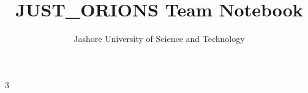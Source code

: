 \documentclass[10pt, a4paper, oneside]{article}
\title{\textbf{JUST\_ORIONS} Team Notebook}
\author{Jashore University of Science and Technology}
\date{}
\begin{document}
\begin{landscape}
\raggedbottom
\begin{multicols*}{3}
\raggedcolumns
\raggedbottom
\maketitle
\vspace{-3ex}
\tableofcontents
\pagestyle{fancy}
 










\end{multicols*}
\end{landscape}
\end{document}
